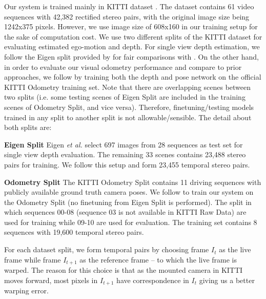 \documentclass[10pt,twocolumn,letterpaper]{article}
\begin{document}
Our system is trained mainly in KITTI dataset \cite{Geiger2013kitti}\cite{Geiger2012kitti}. 
The dataset contains 61 video sequences with 42,382 rectified stereo pairs, with the original image size being 1242x375 pixels. However, we use image size of 608x160 in our training setup for the sake of computation cost. 
We use two different splits of the KITTI dataset for evaluating estimated ego-motion and depth. For single view depth estimation, we follow the Eigen split provided by \cite{eigen2014depth} for fair comparisons with \cite{garg2016depth,godard2016depth,eigen2014depth,liu2016depth}. 
On the other hand, in order to evaluate our visual odometry performance and compare to prior approaches, we follow \cite{zhou2017sfmlearner} by training both the depth and pose network on the official KITTI Odometry training set. Note that there are overlapping scenes between two splits (i.e. some testing scenes of Eigen Split are included in the training scenes of Odometry Split, and vice versa). Therefore, finetuning/testing models trained in any split to another split is not allowable/sensible.
The detail about both splits are:

\noindent\textbf{Eigen Split} 
Eigen \textit{et al.} \cite{eigen2014depth} select 697 images from 28 sequences as test set for single view depth evaluation. The remaining 33 scenes contains 23,488 stereo pairs for training. We  follow this setup and form 23,455 temporal stereo pairs. 

\noindent\textbf{Odometry Split}
The KITTI Odometry Split \cite{Geiger2012kitti} contains 11 driving sequences with publicly available ground truth camera poses.
We follow \cite{zhou2017sfmlearner} to train our system on the Odometry Split (no finetuning from Eigen Split is performed). The split in which sequences 00-08 (sequence 03 is not available in KITTI Raw Data) are used for training while 09-10 are used for evaluation. The training set contains 8 sequences with 19,600 temporal stereo pairs.

For each dataset split, we form temporal pairs by choosing frame $I_t$ as the live frame while frame $I_{t+1}$ as the reference frame -- to which the live frame is warped. The reason for this choice is that as the mounted camera in KITTI moves forward, most pixels in $I_{t+1}$ have correspondence in $I_{t}$ giving us a better warping error.
\end{document}
